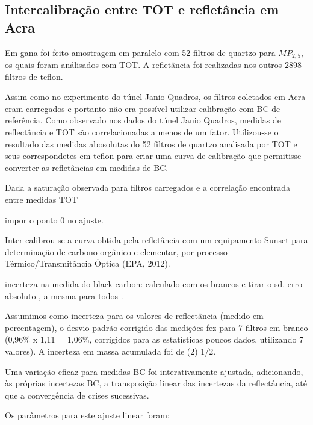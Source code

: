 \subsection{Intercalibração entre TOT e refletância em Acra}

Em gana foi feito amostragem em paralelo com 52 filtros de quartzo para 
$MP_{2,5}$, os quais foram análisados com TOT.
A refletância foi realizadas nos outros 2898 filtros
de teflon.

Assim como no experimento do túnel Janio Quadros, os filtros coletados em Acra
eram carregados e portanto não era possível utilizar calibração com BC de 
referência. Como observado nos dados do túnel Janio Quadros, medidas de 
reflectância e TOT são correlacionadas a menos de um fator.
Utilizou-se o resultado das medidas abosolutas do 52 filtros de quartzo
analisada por TOT e seus correspondetes em teflon para criar uma curva de 
calibração que permitisse converter as refletâncias em medidas de BC.

Dada a saturação observada para filtros carregados e a correlação encontrada entre medidas TOT 

impor o ponto 0 no ajuste.


 

Inter-calibrou-se a curva obtida pela refletância com um equipamento %
Sunset para determinação de carbono orgânico e elementar, 
por processo Térmico/Transmitância Óptica (EPA, 2012).

incerteza na medida do black carbon: calculado com os brancos e tirar o sd. 
erro absoluto , a mesma para todos .

Assumimos como incerteza para os valores de reflectância (medido em percentagem),
o desvio padrão corrigido das medições fez para 7 filtros em branco 
(0,96\% x 1,11 = 1,06\%, corrigidos para as estatísticas poucos dados, 
utilizando 7 valores). 
A incerteza em massa acumulada foi de (2) 1/2. 

Uma variação eficaz para medidas BC foi interativamente ajustada, adicionando, às próprias incertezas BC, a transposição linear das incertezas da reflectância, até que a convergência de crises sucessivas.

Os parâmetros para este ajuste linear foram:






